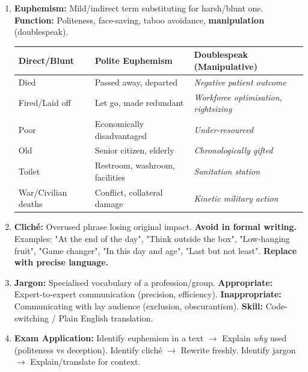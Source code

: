 \documentclass[11pt]{article}
\newcommand{\cle}[1]{{\popxbold\color{popdark}#1}}
\begin{document}
\begin{methode}
\begin{enumerate}
    \item \textbf{\cle{Euphemism}:} Mild/indirect term substituting for harsh/blunt one. \textbf{Function:} Politeness, face-saving, taboo avoidance, \textbf{manipulation} (doublespeak).
    \begin{center}
    \begin{tabular}{|l|l|l|}
    \hline
    \rowcolor{popblueL} \textbf{Direct/Blunt} & \textbf{Polite Euphemism} & \textbf{Doublespeak (Manipulative)} \\
    \hline
    Died & Passed away, departed & \textit{Negative patient outcome} \\
    Fired/Laid off & Let go, made redundant & \textit{Workforce optimisation, rightsizing} \\
    Poor & Economically disadvantaged & \textit{Under-resourced} \\
    Old & Senior citizen, elderly & \textit{Chronologically gifted} \\
    Toilet & Restroom, washroom, facilities & \textit{Sanitation station} \\
    War/Civilian deaths & Conflict, collateral damage & \textit{Kinetic military action} \\
    \hline
    \end{tabular}
    \end{center}
    \item \textbf{\cle{Cliché}:} Overused phrase losing original impact. \textbf{Avoid in formal writing.} Examples: "At the end of the day", "Think outside the box", "Low-hanging fruit", "Game changer", "In this day and age", "Last but not least". \textbf{Replace with precise language.}
    \item \textbf{\cle{Jargon}:} Specialised vocabulary of a profession/group. \textbf{Appropriate:} Expert-to-expert communication (precision, efficiency). \textbf{Inappropriate:} Communicating with lay audience (exclusion, obscurantism). \textbf{Skill:} \cle{Code-switching} / \cle{Plain English translation}.
    \item \textbf{Exam Application:} Identify euphemism in a text $\rightarrow$ Explain \emph{why} used (politeness vs deception). Identify cliché $\rightarrow$ Rewrite freshly. Identify jargon $\rightarrow$ Explain/translate for context.
\end{enumerate}
\end{methode}
\end{document}
